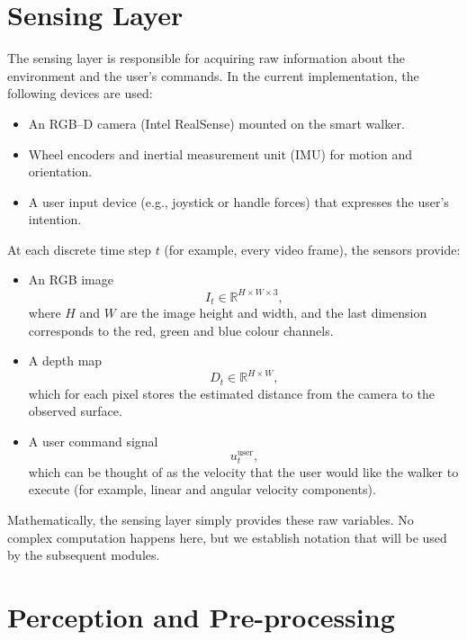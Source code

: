 \documentclass{article}
\begin{document}
\section{Sensing Layer}

The sensing layer is responsible for acquiring raw information about the environment and the user's commands. In the current implementation, the following devices are used:
\begin{itemize}
    \item An RGB--D camera (Intel RealSense) mounted on the smart walker.
    \item Wheel encoders and inertial measurement unit (IMU) for motion and orientation.
    \item A user input device (e.g., joystick or handle forces) that expresses the user's intention.
\end{itemize}

At each discrete time step $t$ (for example, every video frame), the sensors provide:
\begin{itemize}
    \item An RGB image
    \begin{equation}
        I_t \in \mathbb{R}^{H \times W \times 3},
    \end{equation}
    where $H$ and $W$ are the image height and width, and the last dimension corresponds to the red, green and blue colour channels.
    \item A depth map
    \begin{equation}
        D_t \in \mathbb{R}^{H \times W},
    \end{equation}
    which for each pixel stores the estimated distance from the camera to the observed surface.
    \item A user command signal
    \begin{equation}
        u_t^{\text{user}},
    \end{equation}
    which can be thought of as the velocity that the user would like the walker to execute (for example, linear and angular velocity components).
\end{itemize}

Mathematically, the sensing layer simply provides these raw variables. No complex computation happens here, but we establish notation that will be used by the subsequent modules.

\section{Perception and Pre-processing}
\end{document}
